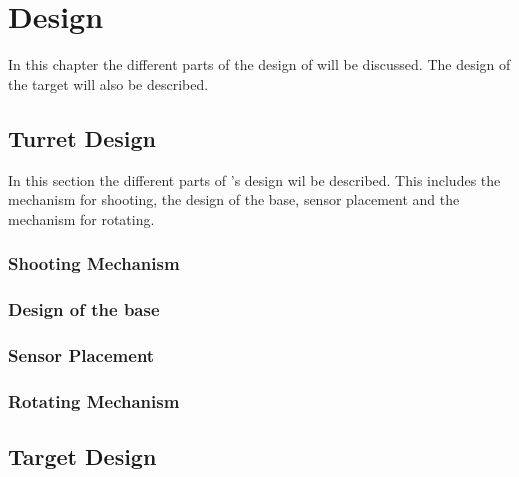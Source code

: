\chapter{Design}
In this chapter the different parts of the design of \name will be discussed.
The design of the target will also be described.

\section{Turret Design}
In this section the different parts of \namep's design wil be described. This
includes the mechanism for shooting, the design of the base, sensor placement
and the mechanism for rotating.

\subsection{Shooting Mechanism}
\subsection{Design of the base}
\subsection{Sensor Placement}
\subsection{Rotating Mechanism}

\section{Target Design}

